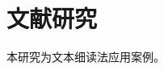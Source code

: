 \documentclass{ctexart}
\begin{document}
\section{文献研究}
本研究为文本细读法应用案例。\cite{kohnen2019}
\end{document}
